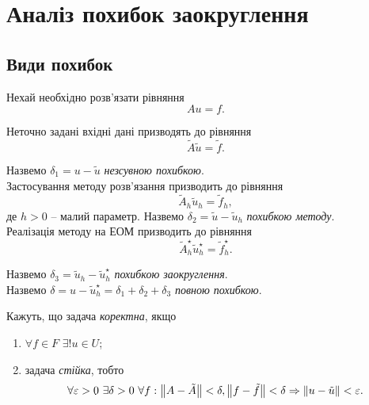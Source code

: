 



\section{Аналіз похибок заокруглення}
	
\subsection{Види похибок}

Нехай необхідно розв'язати рівняння \begin{equation} \label{eq:au=f} Au = f. \end{equation}

Неточно задані вхідні дані призводять до рівняння \begin{equation} \label{eq:au=f 2} \tilde A \tilde u = \tilde f.\end{equation}

Назвемо $\delta_1 = u - \tilde u$ \textit{незсувною похибкою}.\\

Застосування методу розв'язання  призводить до рівняння \begin{equation} \label{eq:au=f 3} \tilde A_h \tilde u_h = \tilde f_h, \end{equation} де $h > 0$ -- малий параметр. Назвемо $\delta_2 = \tilde u - \tilde u_h$ \textit{похибкою методу}.\\

Реалізація методу на ЕОМ призводить до рівняння \begin{equation} \label{eq:au=f 4} \tilde A_h^\star \tilde u_h^\star = \tilde f_h^\star. \end{equation} 

Назвемо $\delta_3 = \tilde u_h - \tilde u_h^\star$ \textit{похибкою заокруглення}. \\

Назвемо $\delta = u - \tilde u_h^\star = \delta_1 + \delta_2 + \delta_3$ \textit{повною похибкою}.

\begin{definition}
	Кажуть, що задача  \textit{коректна}, якщо 
	\begin{enumerate}
		\item $\forall f\in F$ $\exists! u\in U$;
		\item задача  \textit{стійка}, тобто \[\forall \varepsilon > 0 \text{ } \exists \delta > 0 \text{ } \forall f: \left\|A-\tilde A\right\|<\delta, \left\|f-\tilde f\right\|<\delta \Rightarrow \left\|u-\tilde u\right\|<\varepsilon.\]
	\end{enumerate}
\end{definition}

